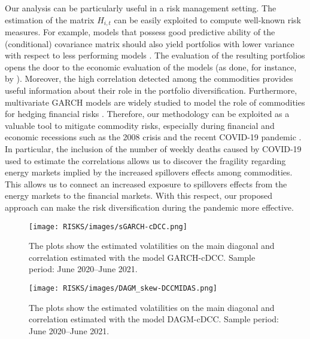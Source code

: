 \begin{paracol}{2}
{Our analysis can be particularly useful in a risk management setting. The estimation of the matrix $H_{i,t}$ can be easily exploited to compute well-known risk measures. For example, models that possess good predictive ability of the (conditional) covariance matrix should also yield portfolios with lower variance with respect to less performing models \citep{Engle2012c}. The evaluation of the resulting
portfolios opens the door to the economic evaluation of the models (as done, for instance, by \citealp{Amendola:Candila:1997}). Moreover, the high correlation detected among the commodities provides useful information about their role in the portfolio diversification.  Furthermore, multivariate GARCH models are widely studied to model the role of commodities for hedging financial risks \citep{chang2011crude, chkili2014instabilities, silvennoinen2013financialization, ku2007application}. Therefore, our methodology can be exploited as a valuable tool to mitigate commodity risks, especially during financial and economic recessions such as the 2008 crisis and the recent COVID-19 pandemic \citep{hauser2020impact}. In particular, the inclusion of the number of weekly deaths caused by COVID-19 used to estimate the correlations allows us to discover the fragility regarding energy markets implied by the increased spillovers effects among commodities. This allows us to connect an increased exposure to spillovers effects from the energy markets to the financial markets. With this respect, our proposed approach can make the risk diversification during the pandemic more effective.}%


\begin{figure}[H]
	
	\texttt{[image: RISKS/images/sGARCH-cDCC.png]}
	\caption{The plots show the estimated volatilities on the main diagonal and correlation estimated with the model GARCH-cDCC. Sample period: June 2020--June 2021.}
	\label{fig:sGARCH-cDCC}
\end{figure}


\begin{figure}[H]
	\texttt{[image: RISKS/images/DAGM\_skew-DCCMIDAS.png]}
	\caption{The plots show the estimated volatilities on the main diagonal and correlation estimated with the model DAGM-cDCC. Sample period: June 2020--June 2021.}
	\label{fig:DAGM_skew-cDCC}
\end{figure}



\end{paracol}
